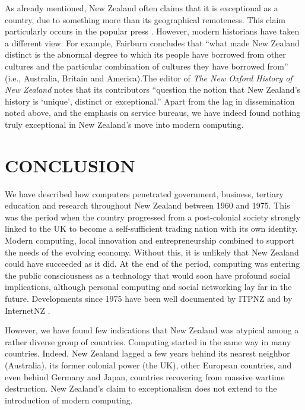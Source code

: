 \documentclass{IEEEcsmag}
\begin{document}
As already mentioned, New Zealand often claims that it is exceptional as a country, due to something more than its geographical remoteness. This claim particularly occurs in the popular press \cite{Frykberg-2025}. However, modern historians have taken a different view. For example, Fairburn \cite{Fairburn-2008} concludes that “what made New Zealand distinct is the
abnormal degree to which its people have borrowed from other cultures and
the particular combination of cultures they have borrowed from” (i.e., Australia, Britain and America).The editor of \textit{The New Oxford History of New Zealand} notes that its contributors “question the notion that New Zealand’s history is ‘unique’, distinct or exceptional.” \cite{Byrnes-2007} Apart from the lag in dissemination noted above, and the emphasis on service bureaus, we have indeed found nothing truly exceptional in New Zealand’s move into modern computing.
\cbend
\vspace*{-8pt}
\section{CONCLUSION}
We have described how computers penetrated government, business, tertiary education 
and research throughout New Zealand between 1960 and 1975. This was the period
when the country progressed from a post-colonial society strongly linked to the UK to
become a self-sufficient trading nation with its own identity. Modern computing,
local innovation and entrepreneurship combined to support the needs of the
evolving economy. Without this, it is unlikely that New Zealand could have
succeeded as it did. At the end of the period, computing was entering the public
consciousness as a technology that would soon have profound social implications,
although personal computing and social networking lay far in the future.
Developments since 1975 have been well documented by ITPNZ \cite{ITPNZ}
and by InternetNZ \cite{ConnectingClouds}.

\cbstart
However, we have found few indications that New Zealand was 
atypical among  a rather diverse group of countries. Computing started in the same
way in many countries. Indeed, New Zealand lagged a few years
behind its nearest neighbor (Australia), its former colonial power (the UK), other European
countries, and even behind Germany and Japan, countries recovering from massive wartime destruction.
New Zealand's claim to exceptionalism does not extend to the introduction of modern computing.
\cbend
\vspace*{-8pt}
\end{document}

